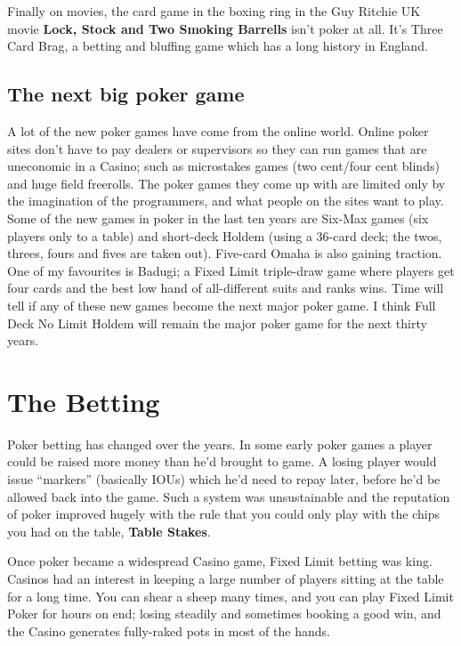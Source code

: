 Finally on movies, the card game in the boxing ring in the Guy Ritchie
UK movie \textbf{Lock, Stock and Two Smoking Barrells} isn't poker at
all. It's Three Card Brag, a betting and bluffing game which has a
long history in England.

\subsection{The next big poker game}

A lot of the new poker games have come from the online world. Online
poker sites don't have to pay dealers or supervisors so they can run
games that are uneconomic in a Casino; such as microstakes games (two
cent/four cent blinds) and huge field freerolls. The poker games they
come up with are limited only by the imagination of the programmers,
and what people on the sites want to play. Some of the new games
in poker in the last ten years are Six-Max games (six players only to
a table) and short-deck Holdem (using a 36-card deck; the twos,
threes, fours and fives are taken out). Five-card Omaha is also
gaining traction. One of my favourites is Badugi; a Fixed Limit
triple-draw game where players get four cards and the best low hand of
all-different suits and ranks wins. Time will tell if any of these new
games become the next major poker game. I think Full Deck No Limit
Holdem will remain the major poker game for the next thirty years.


\section{The Betting}

Poker betting has changed over the years. In some early poker games
a player could be raised more money than he'd brought to
game. A losing player would issue ``markers'' (basically IOUs) which
he'd need to repay later, before he'd be allowed back into the
game. Such a system was unsustainable and the reputation of poker
improved hugely with the rule that you could only play with the
chips you had on the table, \textbf{Table Stakes}.

Once poker became a widespread Casino game, Fixed Limit betting was
king. Casinos had an interest in keeping a large number of players
sitting at the table for a long time. You can shear a sheep many times,
and you can play Fixed Limit Poker for hours on end; losing steadily
and sometimes booking a good win, and the Casino generates fully-raked
pots in most of the hands.

